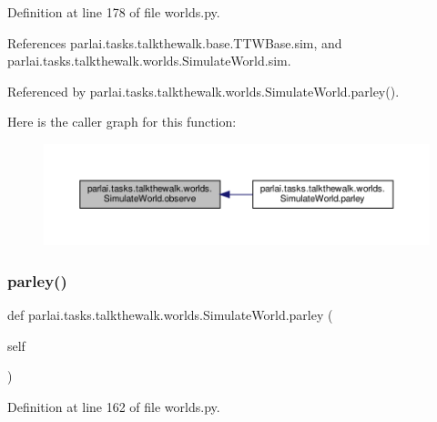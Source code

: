 Definition at line 178 of file worlds.\+py.



References parlai.\+tasks.\+talkthewalk.\+base.\+T\+T\+W\+Base.\+sim, and parlai.\+tasks.\+talkthewalk.\+worlds.\+Simulate\+World.\+sim.



Referenced by parlai.\+tasks.\+talkthewalk.\+worlds.\+Simulate\+World.\+parley().

Here is the caller graph for this function\+:
\nopagebreak
\begin{figure}[H]
\begin{center}
\leavevmode
\includegraphics[width=350pt]{classparlai_1_1tasks_1_1talkthewalk_1_1worlds_1_1SimulateWorld_a1049d955f85f84855bda51be0f3e9a69_icgraph}
\end{center}
\end{figure}
\mbox{\label{classparlai_1_1tasks_1_1talkthewalk_1_1worlds_1_1SimulateWorld_a6bd5a8a8e194dd4aa76aeecdf429bc7f}} 
\subsubsection{\texorpdfstring{parley()}{parley()}}
{\footnotesize\ttfamily def parlai.\+tasks.\+talkthewalk.\+worlds.\+Simulate\+World.\+parley (\begin{DoxyParamCaption}\item[{}]{self }\end{DoxyParamCaption})}



Definition at line 162 of file worlds.\+py.



